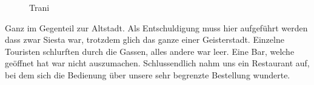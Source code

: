 \begin{figure}[H]
   \centering
   \quad
   \quad
   \quad
   \caption[Trani]{Trani}
\end{figure}

Ganz im Gegenteil zur Altstadt.
Als Entschuldigung muss hier aufgeführt werden dass zwar Siesta war, trotzdem glich das ganze einer Geisterstadt.
Einzelne Touristen schlurften durch die Gassen, alles andere war leer.
Eine Bar, welche geöffnet hat war nicht auszumachen.
Schlussendlich nahm uns ein Restaurant auf, bei dem sich die Bedienung über unsere sehr begrenzte Bestellung wunderte.

